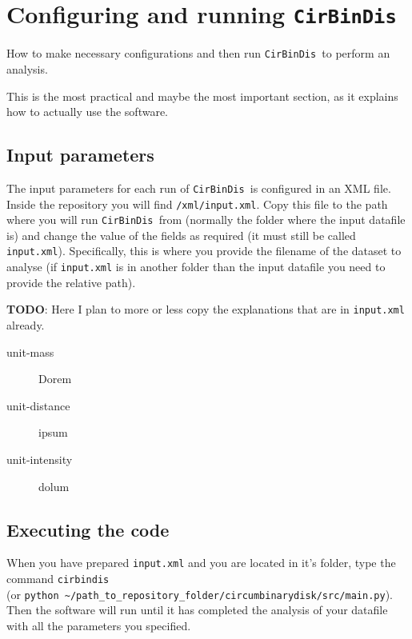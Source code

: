 \documentclass[a4paper, 12pt, english, titlepage]{article}
\newcommand{\sname}{\texttt{CirBinDis }}
\begin{document}
\section{Configuring and running \sname}

How to make necessary configurations and then run \sname to perform an analysis.

This is the most practical and maybe the most important section, as it explains how to actually use the software.

\subsection{Input parameters}
    The input parameters for each run of \sname is configured in an XML file. Inside the repository you will find \texttt{/xml/input.xml}. Copy this file to the path where you will run \sname from (normally the folder where the input datafile is) and change the value of the fields as required (it must still be called \texttt{input.xml}). Specifically, this is where you provide the filename of the dataset to analyse (if \texttt{input.xml} is in another folder than the input datafile you need to provide the relative path).

    \textbf{TODO}: Here I plan to more or less copy the explanations that are in \texttt{input.xml} already.

    \begin{description}
        \item[unit-mass] Dorem
        \item[unit-distance] ipsum
        \item[unit-intensity] dolum
    \end{description}

\subsection{Executing the code}
    When you have prepared \texttt{input.xml} and you are located in it's folder, type the command \texttt{cirbindis} \\
    (or \texttt{python \textasciitilde/path\_to\_repository\_folder/circumbinarydisk/src/main.py}).
    Then the software will run until it has completed the analysis of your datafile with all the parameters you specified.
\end{document}
